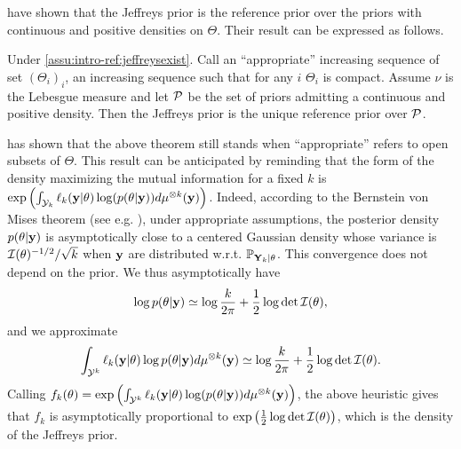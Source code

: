 \citet{clarke_jeffreys_1994} have shown that the Jeffreys prior  is the reference prior over the priors with continuous and positive densities on $\Theta$. Their result can be expressed as follows.
    \begin{thm}\label{thm:intro-ref:clarke}
        Under \cref{assu:intro-ref:jeffreysexist}. Call an ``appropriate'' increasing sequence of set $(\Theta_i)_i$, an increasing sequence such that for any $i$ $\Theta_i$ is compact. Assume $\nu$ is the Lebesgue measure and let $\mathcal{P}$ be the set of priors admitting a continuous and positive density. Then the Jeffreys prior is the unique reference prior over $\mathcal{P}$.
    \end{thm}
\citet{mure_objective_2018} has shown that the above theorem still stands when ``appropriate'' refers to open subsets of $\Theta$. {This result can be anticipated by reminding that the form of the density maximizing the mutual information for a fixed $k$ is $\exp\left(\int_{\mathcal{Y}_k}\ell_k(\mathbf{y}|\theta)\log(p(\theta|\mathbf{y}) ) d\mu^{\otimes k}(\mathbf{y})\right)$. 
Indeed, according to the Bernstein von Mises theorem (see e.g. \cite{van_der_vaart_asymptotic_1992}), under appropriate assumptions, the posterior density $p(\theta|\mathbf{y})$ is asymptotically close  to a %
centered Gaussian density whose  variance is $\mathcal{I}(\theta)^{-1/2}/\sqrt{k}$ when $\mathbf{y}$ are distributed w.r.t. $\mathbb{P}_{\mathbf{Y}_k|\theta}$.
This convergence does not depend {on} the prior. We thus asymptotically have
    \begin{equation}
        \log p(\theta|\mathbf{y})\simeq \log \frac{k}{2\pi}  +\frac{1}{2}\log\det\mathcal{I}(\theta),
    \end{equation}
and we approximate
\begin{equation}
    \int_{\mathcal{Y}^k} \ell_k(\mathbf{y}|\theta)\log p(\theta|\mathbf{y}) d\mu^{\otimes k}(\mathbf{y})\simeq \log\frac{k}{2\pi} + \frac{1}{2}\log\det\mathcal{I}(\theta).
\end{equation}
Calling $f_k(\theta) = \exp\left(\int_{\mathcal{Y}^k}\ell_k(\mathbf{y}|\theta)\log(p(\theta|\mathbf{y}))d\mu^{\otimes k}(\mathbf{y})  \right)$, the above heuristic gives that $f_k$ is asymptotically proportional to $\exp\left(\frac{1}{2}\log\det\mathcal{I}(\theta)\right)$, which is the density of the Jeffreys prior.}



